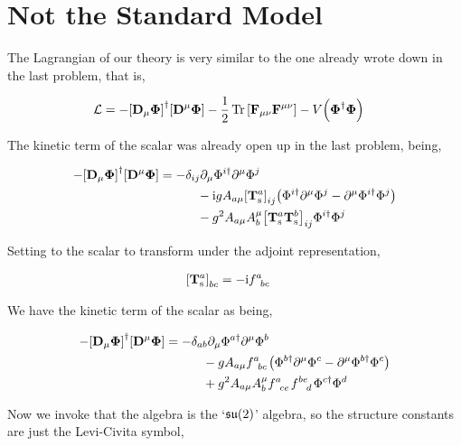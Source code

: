 \section{Not the Standard Model}

The Lagrangian of our theory is very similar to the one already wrote down in the last problem, 
that is,

\begin{align}
    \mathcal L&=-\qty[\vb D_\mu \boldsymbol\Phi]^\dagger\qty[\vb D^\mu\boldsymbol\Phi]
    -\frac12\Tr\qty[\vb F_{\mu\nu}\vb F^{\mu\nu}]-V\qty(\boldsymbol\Phi^\dagger\boldsymbol\Phi)\nonumber
\end{align}

The kinetic term of the scalar was already open up in the last problem, being,

\begin{align}
    -\qty[\vb D_\mu \boldsymbol\Phi]^\dagger\qty[\vb D^\mu\boldsymbol\Phi]&=-\delta_{ij}\partial_\mu\Phi^{i\dagger}\partial^\mu\Phi^j\nonumber\\
    &\quad\quad\quad
    -\im gA_{a\mu}\tensor{\qty[\vb T^{a}_{\textnormal s}]}{_i_j}\qty(\Phi^{i\dagger}\partial^\mu\Phi^j-\partial^\mu\Phi^{i\dagger}\Phi^j)\nonumber\\
    &\quad\quad\quad-g^2A_{a\mu}A_b^\mu
    \tensor{\qty[\vb T^{a}_{\textnormal s}\vb T^b_{\textnormal s}]}{_i_j}
    \Phi^{i\dagger}\Phi^j\nonumber
\end{align}

Setting to the scalar to transform under the adjoint representation,

\begin{align}
    \tensor{\qty[\vb T^{a}_{\textnormal s}]}{_b_c}&=-\im\tensor{f}{^a_b_c}\nonumber
\end{align}

We have the kinetic term of the scalar as being,

\begin{align}
    -\qty[\vb D_\mu \boldsymbol\Phi]^\dagger\qty[\vb D^\mu\boldsymbol\Phi]&=-\delta_{ab}\partial_\mu\Phi^{a\dagger}\partial^\mu\Phi^b\nonumber\\
    &\quad\quad\quad
    -gA_{a\mu}\tensor{f}{^a_b_c}\qty(\Phi^{b\dagger}\partial^\mu\Phi^c-\partial^\mu\Phi^{b\dagger}\Phi^c)\nonumber\\
    &\quad\quad\quad+g^2A_{a\mu}A_b^\mu
    \tensor{f}{^a_c_e}\tensor{f}{^b^e_d}
    \Phi^{c\dagger}\Phi^d\nonumber
\end{align}

Now we invoke that the algebra is the `$\mathfrak{su}\qty(2)$' algebra, so the structure constants are just the Levi-Civita 
symbol,

